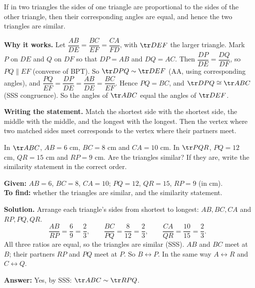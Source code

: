 \begin{theorem}
If in two triangles the sides of one triangle are proportional to the sides of the other triangle, then their corresponding angles are equal, and hence the two triangles are similar.
\end{theorem}

\textbf{Why it works.} Let $\dfrac{AB}{DE}=\dfrac{BC}{EF}=\dfrac{CA}{FD}$, with $\tr DEF$ the larger triangle. Mark $P$ on $DE$ and $Q$ on $DF$ so that $DP=AB$ and $DQ=AC$. Then $\dfrac{DP}{DE}=\dfrac{DQ}{DF}$, so $PQ\parallel EF$ (converse of BPT). So $\tr DPQ\sim\tr DEF$ (AA, using corresponding angles), and $\dfrac{PQ}{EF}=\dfrac{DP}{DE}=\dfrac{AB}{DE}=\dfrac{BC}{EF}$. Hence $PQ=BC$, and $\tr DPQ\cong\tr ABC$ (SSS congruence). So the angles of $\tr ABC$ equal the angles of $\tr DEF$.

\textbf{Writing the statement.} Match the shortest side with the shortest side, the middle with the middle, and the longest with the longest. Then the vertex where two matched sides meet corresponds to the vertex where their partners meet.

\begin{example}
In $\tr ABC$, $AB=6$ cm, $BC=8$ cm and $CA=10$ cm. In $\tr PQR$, $PQ=12$ cm, $QR=15$ cm and $RP=9$ cm. Are the triangles similar? If they are, write the similarity statement in the correct order.


\textbf{Given:} $AB=6$, $BC=8$, $CA=10$; $PQ=12$, $QR=15$, $RP=9$ (in cm).\\
\textbf{To find:} whether the triangles are similar, and the similarity statement.

\textbf{Solution.} Arrange each triangle's sides from shortest to longest: $AB,BC,CA$ and $RP,PQ,QR$.
\[
\dfrac{AB}{RP}=\dfrac69=\dfrac23,\qquad \dfrac{BC}{PQ}=\dfrac8{12}=\dfrac23,\qquad \dfrac{CA}{QR}=\dfrac{10}{15}=\dfrac23.
\]
All three ratios are equal, so the triangles are similar (SSS). $AB$ and $BC$ meet at $B$; their partners $RP$ and $PQ$ meet at $P$. So $B\leftrightarrow P$. In the same way $A\leftrightarrow R$ and $C\leftrightarrow Q$.

\textbf{Answer:} Yes, by SSS: $\tr ABC\sim\tr RPQ$.
\end{example}

